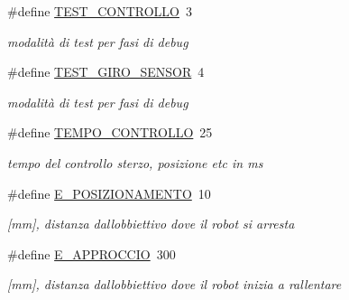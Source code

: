 \begin{DoxyCompactItemize}
\#define \mbox{\hyperlink{ari_pi__2_d_c__esp__08_8ino_ab57f62e8f32f367dbca255771ff72e20}{T\+E\+S\+T\+\_\+\+C\+O\+N\+T\+R\+O\+L\+LO}}~3
\begin{DoxyCompactList}\small\item\em modalità di test per fasi di debug \end{DoxyCompactList}\item 
\mbox{\label{ari_pi__2_d_c__esp__08_8ino_adcc6c25175a8908813ff718bc774c2ab}} 
\#define \mbox{\hyperlink{ari_pi__2_d_c__esp__08_8ino_adcc6c25175a8908813ff718bc774c2ab}{T\+E\+S\+T\+\_\+\+G\+I\+R\+O\+\_\+\+S\+E\+N\+S\+OR}}~4
\begin{DoxyCompactList}\small\item\em modalità di test per fasi di debug \end{DoxyCompactList}\item 
\mbox{\label{ari_pi__2_d_c__esp__08_8ino_ab6c0fc0e0028f3917b0ce67bee73d01e}} 
\#define \mbox{\hyperlink{ari_pi__2_d_c__esp__08_8ino_ab6c0fc0e0028f3917b0ce67bee73d01e}{T\+E\+M\+P\+O\+\_\+\+C\+O\+N\+T\+R\+O\+L\+LO}}~25
\begin{DoxyCompactList}\small\item\em tempo del controllo sterzo, posizione etc in ms \end{DoxyCompactList}\item 
\mbox{\label{ari_pi__2_d_c__esp__08_8ino_a140e19c4b6cb883d0f3abceea67a62ba}} 
\#define \mbox{\hyperlink{ari_pi__2_d_c__esp__08_8ino_a140e19c4b6cb883d0f3abceea67a62ba}{E\+\_\+\+P\+O\+S\+I\+Z\+I\+O\+N\+A\+M\+E\+N\+TO}}~10
\begin{DoxyCompactList}\small\item\em \mbox{[}mm\mbox{]}, distanza dall\textquotesingle{}obbiettivo dove il robot si arresta \end{DoxyCompactList}\item 
\mbox{\label{ari_pi__2_d_c__esp__08_8ino_a60736df151b230ad9683a2e8dbee13a6}} 
\#define \mbox{\hyperlink{ari_pi__2_d_c__esp__08_8ino_a60736df151b230ad9683a2e8dbee13a6}{E\+\_\+\+A\+P\+P\+R\+O\+C\+C\+IO}}~300
\begin{DoxyCompactList}\small\item\em \mbox{[}mm\mbox{]}, distanza dall\textquotesingle{}obbiettivo dove il robot inizia a rallentare \end{DoxyCompactList}\item 

\end{DoxyCompactItemize}

